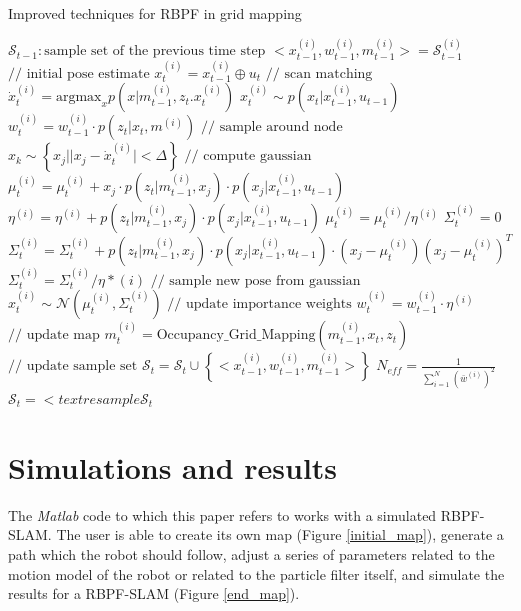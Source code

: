 \documentclass[letterpaper]{article}
\begin{document}
\begin{algorithm}
	\caption{Improved techniques for RBPF in grid mapping}\label{RBPF-SLAM}
	\begin{algorithmic}[1]
		\State $ \mathcal{S}_{t-1}: \text{sample set of the previous time step} $
		\State $ < x_{t-1}^{(i)}, w_{t-1}^{(i)}, m_{t-1}^{(i)} > = \mathcal{S}_{t-1}^{(i)}$
		\State $ \text{// initial pose estimate} $
		\State $ x_t^{(i)} = x_{t-1}^{(i)} \oplus u_t$
		\State $ \text{// scan matching}$
		\State $ \dot x_t^{(i)} = \text{argmax}_x p(x|m_{t-1}^{(i)}, z_t. x_t^{(i)})$
		\State $ x_t^{(i)} \sim  p(x_t|x_{t-1}^{(i)}, u_{t-1})$
		\State $w_t^{(i)}=w_{t-1}^{(i)} \cdot p(z_t|x_t, m^{(i)}) $
		\Else
		\State $ \text{// sample around node} $ 
		\State $ x_k \sim \left\{ x_j || x_j - \dot x_t^{(i)}| < \Delta \right\} $
		\EndFor
		\State $ \text{// compute gaussian}$
		\State $ \mu_t^{(i)}  = \mu_t^{(i)} + x_j \cdot p(z_t|m_{t-1}^{(i)}, x_j) \cdot p(x_j|x_{t-1}^{(i)}, u_{t-1})$
		\State $ \eta^{(i)}  = \eta^{(i)} + p(z_t|m_{t-1}^{(i)}, x_j) \cdot p(x_j|x_{t-1}^{(i)}, u_{t-1})$
		\EndFor
		\State $\mu_t^{(i)}  = \mu_t^{(i)} / \eta^{(i)} $
		\State $ \Sigma_t^{(i)}=0$
		\State $ \Sigma_t^{(i)}= \Sigma_t^{(i)} + p(z_t|m_{t-1}^{(i)}, x_j) \cdot p(x_j|x_{t-1}^{(i)}, u_{t-1}) \cdot (x_j - \mu_t^{(i)})(x_j - \mu_t^{(i)})^T  $
		\EndFor
		\State $ \Sigma_t^{(i)}= \Sigma_t^{(i)}/ \eta*{(i)}$
		\State $ \text{// sample new pose from gaussian}$
		\State $ x_t^{(i)} \sim \mathcal{N} (\mu_t^{(i)}, \Sigma_t^{(i)}) $
		\State $ \text{// update importance weights}$
		\State $ w_t^{(i)}=w_{t-1}^{(i)} \cdot \eta^{(i)} $
		\EndIf
		\State $ \text{// update map}$
		\State $ m_t^{(i)} = \text{Occupancy\_Grid\_Mapping} (m_{t-1}^{(i)}, x_t, z_t)$
		\State $ \text{// update sample set}$
		\State $ \mathcal{S}_t = \mathcal{S}_t \cup  \left\{ < x_{t-1}^{(i)}, w_{t-1}^{(i)}, m_{t-1}^{(i)} > \right\} $
		\EndFor
		\State $ N_{eff} = \frac{1}{\sum_{i=1}^N (\bar w^{(i)})^2} $
		\State $\mathcal{S}_t = <text{resample} \mathcal{S}_t $
		\EndIf
		\EndProcedure
	\end{algorithmic}
\end{algorithm}

\section{Simulations and results}
The  \textit{Matlab} code to which this paper refers to works with a simulated RBPF-SLAM. The user is able to create its own map (Figure \ref{initial_map}), generate a path which the robot should follow, adjust a series of parameters related to the motion model of the robot or related to the particle filter itself, and simulate the results for a RBPF-SLAM (Figure \ref{end_map}).
\end{document}
